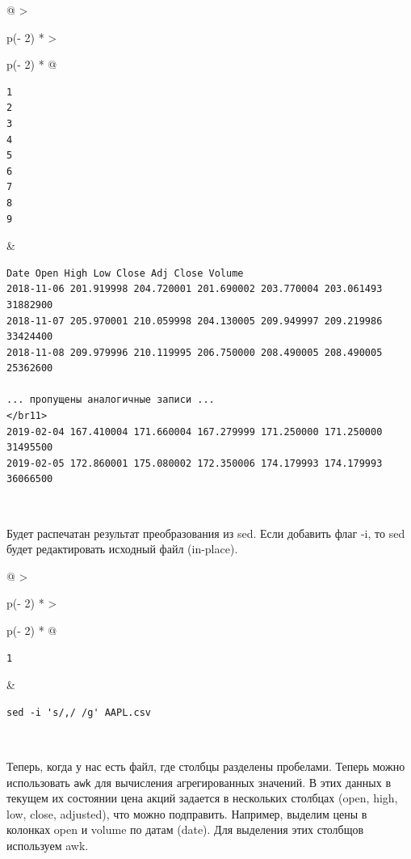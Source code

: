 \documentclass{article}
\begin{document}
\begin{longtable}[]{@{}
  >{\raggedright\arraybackslash}p{(\columnwidth - 2\tabcolsep) * }
  >{\raggedright\arraybackslash}p{(\columnwidth - 2\tabcolsep) * }@{}}
\toprule
\endhead
\begin{minipage}[t]{\linewidth}\raggedright
\begin{verbatim}
1
2
3
4
5
6
7
8
9
\end{verbatim}
\end{minipage} & \begin{minipage}[t]{\linewidth}\raggedright
\begin{verbatim}
Date Open High Low Close Adj Close Volume
2018-11-06 201.919998 204.720001 201.690002 203.770004 203.061493 31882900
2018-11-07 205.970001 210.059998 204.130005 209.949997 209.219986 33424400
2018-11-08 209.979996 210.119995 206.750000 208.490005 208.490005 25362600

... пропущены аналогичные записи ...
</br11>
2019-02-04 167.410004 171.660004 167.279999 171.250000 171.250000 31495500
2019-02-05 172.860001 175.080002 172.350006 174.179993 174.179993 36066500
\end{verbatim}
\end{minipage} \\ \addlinespace
\bottomrule
\end{longtable}

Будет распечатан результат преобразования из sed. Если добавить флаг -i,
то sed будет редактировать исходный файл (in-place).

\begin{longtable}[]{@{}
  >{\raggedright\arraybackslash}p{(\columnwidth - 2\tabcolsep) * }
  >{\raggedright\arraybackslash}p{(\columnwidth - 2\tabcolsep) * }@{}}
\toprule
\endhead
\begin{minipage}[t]{\linewidth}\raggedright
\begin{verbatim}
1
\end{verbatim}
\end{minipage} & \begin{minipage}[t]{\linewidth}\raggedright
\begin{verbatim}
sed -i 's/,/ /g' AAPL.csv
\end{verbatim}
\end{minipage} \\ \addlinespace
\bottomrule
\end{longtable}

Теперь, когда у нас есть файл, где столбцы разделены пробелами. Теперь
можно использовать \texttt{awk} для вычисления агрегированных значений.
В этих данных в текущем их состоянии цена акций задается в нескольких
столбцах (open, high, low, close, adjusted), что можно подправить.
Например, выделим цены в колонках open и volume по датам (date). Для
выделения этих столбщов используем awk.
\end{document}
